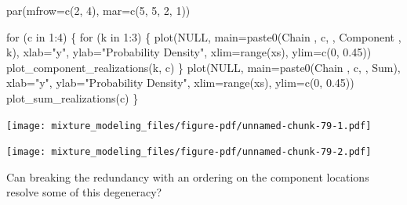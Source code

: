 \documentclass[
  letterpaper,
  DIV=11,
  numbers=noendperiod]{scrartcl}
\newenvironment{Shaded}{\begin{snugshade}}{\end{snugshade}}
\newcommand{\AttributeTok}[1]{\textcolor[rgb]{0.40,0.45,0.13}{#1}}
\newcommand{\ConstantTok}[1]{\textcolor[rgb]{0.56,0.35,0.01}{#1}}
\newcommand{\ControlFlowTok}[1]{\textcolor[rgb]{0.00,0.23,0.31}{#1}}
\newcommand{\DecValTok}[1]{\textcolor[rgb]{0.68,0.00,0.00}{#1}}
\newcommand{\FloatTok}[1]{\textcolor[rgb]{0.68,0.00,0.00}{#1}}
\newcommand{\FunctionTok}[1]{\textcolor[rgb]{0.28,0.35,0.67}{#1}}
\newcommand{\NormalTok}[1]{\textcolor[rgb]{0.00,0.23,0.31}{#1}}
\newcommand{\SpecialCharTok}[1]{\textcolor[rgb]{0.37,0.37,0.37}{#1}}
\newcommand{\StringTok}[1]{\textcolor[rgb]{0.13,0.47,0.30}{#1}}
\begin{document}
\begin{Shaded}
\begin{Highlighting}[]
\FunctionTok{par}\NormalTok{(}\AttributeTok{mfrow=}\FunctionTok{c}\NormalTok{(}\DecValTok{2}\NormalTok{, }\DecValTok{4}\NormalTok{), }\AttributeTok{mar=}\FunctionTok{c}\NormalTok{(}\DecValTok{5}\NormalTok{, }\DecValTok{5}\NormalTok{, }\DecValTok{2}\NormalTok{, }\DecValTok{1}\NormalTok{))}

\ControlFlowTok{for}\NormalTok{ (c }\ControlFlowTok{in} \DecValTok{1}\SpecialCharTok{:}\DecValTok{4}\NormalTok{) \{}
  \ControlFlowTok{for}\NormalTok{ (k }\ControlFlowTok{in} \DecValTok{1}\SpecialCharTok{:}\DecValTok{3}\NormalTok{) \{}
    \FunctionTok{plot}\NormalTok{(}\ConstantTok{NULL}\NormalTok{, }\AttributeTok{main=}\FunctionTok{paste0}\NormalTok{(}\StringTok{\textquotesingle{}Chain \textquotesingle{}}\NormalTok{, c, }\StringTok{\textquotesingle{}, Component \textquotesingle{}}\NormalTok{, k),}
         \AttributeTok{xlab=}\StringTok{"y"}\NormalTok{, }\AttributeTok{ylab=}\StringTok{"Probability Density"}\NormalTok{,}
         \AttributeTok{xlim=}\FunctionTok{range}\NormalTok{(xs), }\AttributeTok{ylim=}\FunctionTok{c}\NormalTok{(}\DecValTok{0}\NormalTok{, }\FloatTok{0.45}\NormalTok{))}
    \FunctionTok{plot\_component\_realizations}\NormalTok{(k, c)}
\NormalTok{  \}}
  \FunctionTok{plot}\NormalTok{(}\ConstantTok{NULL}\NormalTok{, }\AttributeTok{main=}\FunctionTok{paste0}\NormalTok{(}\StringTok{\textquotesingle{}Chain \textquotesingle{}}\NormalTok{, c, }\StringTok{\textquotesingle{}, Sum\textquotesingle{}}\NormalTok{),}
       \AttributeTok{xlab=}\StringTok{"y"}\NormalTok{, }\AttributeTok{ylab=}\StringTok{"Probability Density"}\NormalTok{,}
       \AttributeTok{xlim=}\FunctionTok{range}\NormalTok{(xs), }\AttributeTok{ylim=}\FunctionTok{c}\NormalTok{(}\DecValTok{0}\NormalTok{, }\FloatTok{0.45}\NormalTok{))}
  \FunctionTok{plot\_sum\_realizations}\NormalTok{(c)}
\NormalTok{\}}
\end{Highlighting}
\end{Shaded}

\texttt{[image: mixture\_modeling\_files/figure-pdf/unnamed-chunk-79-1.pdf]}

\texttt{[image: mixture\_modeling\_files/figure-pdf/unnamed-chunk-79-2.pdf]}

Can breaking the redundancy with an ordering on the component locations
resolve some of this degeneracy?
\end{document}
